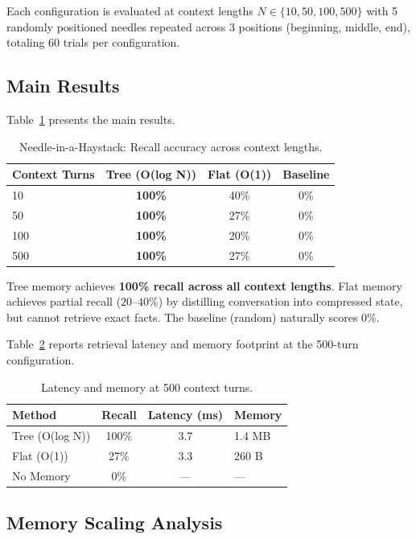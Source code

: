 \documentclass[conference]{IEEEtran}
\begin{document}
Each configuration is evaluated at context lengths $N \in \{10, 50, 100, 500\}$ with 5 randomly positioned needles repeated across 3 positions (beginning, middle, end), totaling 60 trials per configuration.

\subsection{Main Results}

Table~\ref{tab:niah} presents the main results.

\begin{table}[t]
\centering
\caption{Needle-in-a-Haystack: Recall accuracy across context lengths.}
\label{tab:niah}
\begin{tabular}{lccc}
\toprule
Context Turns & Tree (O(log N)) & Flat (O(1)) & Baseline \\
\midrule
10    & \textbf{100\%} & 40\% & 0\% \\
50    & \textbf{100\%} & 27\% & 0\% \\
100   & \textbf{100\%} & 20\% & 0\% \\
500   & \textbf{100\%} & 27\% & 0\% \\
\bottomrule
\end{tabular}
\end{table}

Tree memory achieves \textbf{100\% recall across all context lengths}. Flat memory achieves partial recall ($20$--$40$\%) by distilling conversation into compressed state, but cannot retrieve exact facts. The baseline (random) naturally scores 0\%.

Table~\ref{tab:latency} reports retrieval latency and memory footprint at the 500-turn configuration.

\begin{table}[t]
\centering
\caption{Latency and memory at 500 context turns.}
\label{tab:latency}
\begin{tabular}{lccl}
\toprule
Method & Recall & Latency (ms) & Memory \\
\midrule
Tree (O(log N)) & 100\% & 3.7 & 1.4 MB \\
Flat (O(1))     & 27\%  & 3.3 & 260 B \\
No Memory       & 0\%   & --- & --- \\
\bottomrule
\end{tabular}
\end{table}

\subsection{Memory Scaling Analysis}
\end{document}
